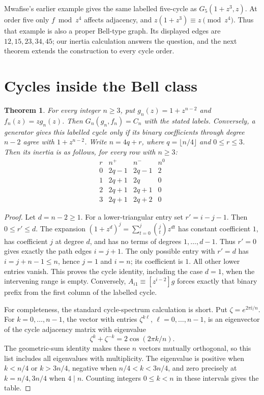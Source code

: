 \documentclass[11pt]{article}
\newtheorem{theorem}{Theorem}
\newcommand{\np}{n^+}
\newcommand{\nm}{n^-}
\begin{document}
Mwafise's earlier example \cite[README \S4.4]{Mwafise} gives the
same labelled five-cycle as $G_5(1+z^3,z)$. At order five only
$f\bmod z^4$ affects adjacency, and $z(1+z^3)\equiv z\pmod{z^4}$.
Thus that example is also a proper Bell-type graph. Its displayed
edges are $12,15,23,34,45$; our inertia calculation answers the question,
and the next theorem extends the construction to every cycle order.

\section{Cycles inside the Bell class}
\begin{theorem}\label{thm:cycles}
For every integer $n\geq3$, put $g_n(z)=1+z^{n-2}$ and $f_n(z)=zg_n(z)$.
Then $G_n(g_n,f_n)=C_n$ with the stated labels. Conversely, a generator
gives this labelled cycle only if its binary coefficients through degree
$n-2$ agree with $1+z^{n-2}$. Write $n=4q+r$,
where $q=\lfloor n/4\rfloor$ and $0\leq r\leq3$. Then
its inertia is as follows, for every row with $n\geq3$:
\[
\begin{array}{c|ccc}
 r&\np&\nm&n^0\\\hline
 0&2q-1&2q-1&2\\
 1&2q+1&2q&0\\
 2&2q+1&2q+1&0\\
 3&2q+1&2q+2&0
\end{array}
\]
\end{theorem}
\begin{proof}
Let $d=n-2\geq1$. For a lower-triangular entry set $r'=i-j-1$.
Then $0\leq r'\leq d$. The expansion
$(1+z^d)^j=\sum_{t=0}^j\binom jt z^{dt}$ has constant coefficient $1$,
has coefficient $j$ at degree $d$, and has no terms of degrees
$1,\ldots,d-1$. Thus $r'=0$ gives exactly the path edges $i=j+1$.
The only possible entry with $r'=d$ has $i=j+n-1\leq n$, hence
$j=1$ and $i=n$; its coefficient is $1$.
All other lower entries vanish. This proves the cycle identity,
including the case $d=1$, when the intervening range is empty.
Conversely, $A_{i1}\equiv[z^{i-2}]g$ forces exactly that binary prefix
from the first column of the labelled cycle.

For completeness, the standard cycle-spectrum calculation
\cite[\S1.4.3]{BH} is short. Put $\zeta=e^{2\pi\mathrm{i}/n}$.
For $k=0,\ldots,n-1$, the vector with entries $\zeta^{k\ell}$,
$\ell=0,\ldots,n-1$, is an eigenvector of the cycle adjacency matrix
with eigenvalue
\[
 \zeta^k+\zeta^{-k}=2\cos(2\pi k/n).
\]
The geometric-sum identity makes these $n$ vectors mutually
orthogonal, so this list includes all eigenvalues with multiplicity.
The eigenvalue is positive when $k<n/4$ or $k>3n/4$, negative when
$n/4<k<3n/4$, and zero precisely at $k=n/4,3n/4$ when $4\mid n$.
Counting integers $0\leq k<n$ in these intervals gives the table.
\end{proof}
\end{document}
